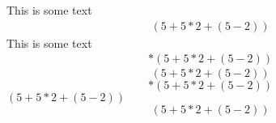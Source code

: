 This is some text
\begin{align}\label{equ1(good)}%
(5+5*2+(5-2))%
\end{align}
This is some text
\begin{align}*
(5+5*2+(5-2))
\end{align}
\begin{equation}\label{equ2(good)}
(5+5*2+(5-2))%
\end{equation}
\begin{equation}*
(5+5*2+(5-2))
\end{equation}
\((5+5*2+(5-2))\)
\[(5+5*2+(5-2))\]
